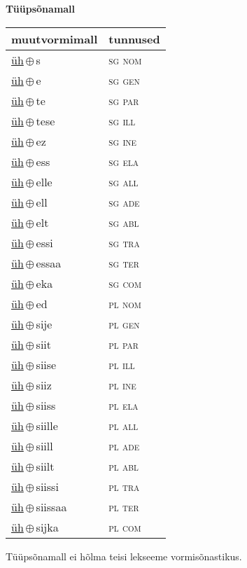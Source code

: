 

\vspace{3.5em}
\noindent \begin{minipage}{\textwidth}
\noindent \textbf{Tüüpsõnamall \,}\\

\begin{sideways}
\begin{tabular}{l l}
muutvormimall & tunnused \\
\hline
\underline{üh}\,$\oplus$\,s & \textsc{ sg nom } \\
\underline{üh}\,$\oplus$\,e & \textsc{ sg gen } \\
\underline{üh}\,$\oplus$\,te & \textsc{ sg par } \\
\underline{üh}\,$\oplus$\,tese & \textsc{ sg ill } \\
\underline{üh}\,$\oplus$\,ez & \textsc{ sg ine } \\
\underline{üh}\,$\oplus$\,ess & \textsc{ sg ela } \\
\underline{üh}\,$\oplus$\,elle & \textsc{ sg all } \\
\underline{üh}\,$\oplus$\,ell & \textsc{ sg ade } \\
\underline{üh}\,$\oplus$\,elt & \textsc{ sg abl } \\
\underline{üh}\,$\oplus$\,essi & \textsc{ sg tra } \\
\underline{üh}\,$\oplus$\,essaa & \textsc{ sg ter } \\
\underline{üh}\,$\oplus$\,eka & \textsc{ sg com } \\
\underline{üh}\,$\oplus$\,ed & \textsc{ pl nom } \\
\underline{üh}\,$\oplus$\,sije & \textsc{ pl gen } \\
\underline{üh}\,$\oplus$\,siit & \textsc{ pl par } \\
\underline{üh}\,$\oplus$\,siise & \textsc{ pl ill } \\
\underline{üh}\,$\oplus$\,siiz & \textsc{ pl ine } \\
\underline{üh}\,$\oplus$\,siiss & \textsc{ pl ela } \\
\underline{üh}\,$\oplus$\,siille & \textsc{ pl all } \\
\underline{üh}\,$\oplus$\,siill & \textsc{ pl ade } \\
\underline{üh}\,$\oplus$\,siilt & \textsc{ pl abl } \\
\underline{üh}\,$\oplus$\,siissi & \textsc{ pl tra } \\
\underline{üh}\,$\oplus$\,siissaa & \textsc{ pl ter } \\
\underline{üh}\,$\oplus$\,sijka & \textsc{ pl com } \\
\end{tabular}
\end{sideways}
\label{tab:tüüpsõnamall-ühs}

\end{minipage}

 
\vspace{1em}
\noindent Tüüpsõnamall  ei hõlma teisi lekseeme vormi\-sõnastikus.
